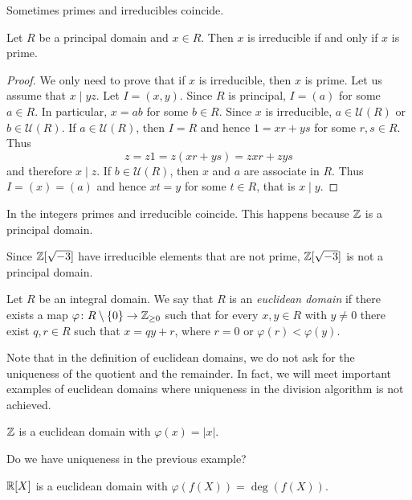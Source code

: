 Sometimes primes and irreducibles coincide. 

\begin{proposition}
\label{pro:PID:irreducible=prime}
	Let $R$ be a principal domain and $x\in R$. 
	Then $x$ is irreducible if and only if $x$ is prime. 	
\end{proposition}

\begin{proof}
	We only need to prove that if $x$ is irreducible, then $x$ is prime. Let us
	assume that $x\mid yz$. Let $I=(x,y)$. Since $R$ is principal, $I=(a)$ for some $a\in R$. In particular, $x=ab$ for some $b\in R$. Since $x$ is irreducible, $a\in\mathcal{U}(R)$ or
	$b\in\mathcal{U}(R)$. If $a\in\mathcal{U}(R)$, then $I=R$ and hence 
	$1=xr+ys$ for some $r,s\in R$. Thus
	\[
	z=z1=z(xr+ys)=zxr+zys
	\]
	and therefore $x\mid z$. If $b\in\mathcal{U}(R)$, then $x$ and $a$ are associate
	in $R$. Thus $I=(x)=(a)$ and hence $xt=y$ for some $t\in R$, that is $x\mid y$.  
\end{proof}

In the integers primes and irreducible coincide. This happens 
because $\mathbb{Z}$ is a principal domain.

\begin{example}
	Since $\mathbb{Z}[\sqrt{-3}]$ have irreducible elements that are not prime, 
	$\mathbb{Z}[\sqrt{-3}]$ is not a principal domain.
\end{example}

\begin{definition}
	Let $R$ be an integral domain. We say that $R$ is an \emph{euclidean domain}
	if there exists a map $\varphi\colon R\setminus\{0\}\to\mathbb{Z}_{\geq0}$ such that
	for every $x,y\in R$ with $y\ne 0$ there exist $q,r\in R$ such that 
	$x=qy+r$, where $r=0$ or $\varphi(r)<\varphi(y)$. 
\end{definition}

Note that in the definition of euclidean domains, we do not ask for the uniqueness 
of the quotient and the remainder. In fact, 
we will meet important examples of euclidean domains where uniqueness
in the division algorithm is not achieved. 

\begin{example}
	$\mathbb{Z}$ is a euclidean domain with $\varphi(x)=|x|$.
\end{example}

Do we have uniqueness in the previous example? 	

\begin{example}
	$\mathbb{R}[X]$ is a euclidean domain with $\varphi(f(X))=\deg(f(X))$. 	
\end{example}

